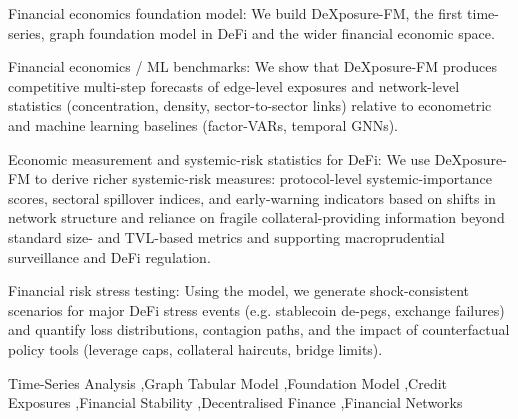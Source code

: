 \documentclass[preprint,12pt]{elsarticle}
\begin{document}
\begin{frontmatter}
\begin{abstract}
On the financial economics front, we use the foundation model to construct dynamic measures of (1) protocol-level systemic importance, (2) sector-to-sector spillover indices, and (3) early-warning indicators based on shifts in network concentration and dependence on fragile collateral. We show how these AI-generated statistics can support macroprudential monitoring, DeFi-specific stress testing, and counterfactual policy evaluation (e.g., caps on bridges or leverage and alternative collateral rules), while also highlighting conditions under which foundation-model-based measures of digital financial infrastructure are robust, and where they call for cautious interpretation by regulators and central banks.





\end{abstract}



\begin{highlights}
\item Financial economics foundation model: We build DeXposure-FM, the first time-series, graph foundation model in DeFi and the wider financial economic space.

\item Financial economics / ML benchmarks: We show that DeXposure-FM produces competitive multi-step forecasts of edge-level exposures and network-level statistics (concentration, density, sector-to-sector links) relative to econometric and machine learning baselines (factor-VARs, temporal GNNs).

\item Economic measurement and systemic-risk statistics for DeFi: We use DeXposure-FM to derive richer systemic-risk measures: protocol-level systemic-importance scores, sectoral spillover indices, and early-warning indicators based on shifts in network structure and reliance on fragile collateral-providing information beyond standard size- and TVL-based metrics and supporting macroprudential surveillance and DeFi regulation.

\item Financial risk stress testing: Using the model, we generate shock-consistent scenarios for major DeFi stress events (e.g. stablecoin de-pegs, exchange failures) and quantify loss distributions, contagion paths, and the impact of counterfactual policy tools (leverage caps, collateral haircuts, bridge limits).
\end{highlights}

\begin{keyword}
Time-Series Analysis \sep Graph Tabular Model \sep Foundation Model \sep Credit Exposures \sep Financial Stability \sep Decentralised Finance \sep Financial Networks








\end{keyword}

\end{frontmatter}
\end{document}
